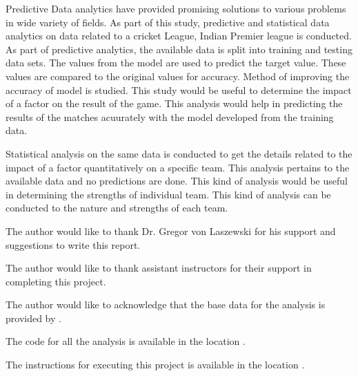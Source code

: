 \documentclass[sigconf]{acmart}
\begin{document}
Predictive Data analytics have provided promising solutions to various problems in wide variety of fields. As part of this study, predictive and statistical data analytics on data related to a cricket League, Indian Premier league is conducted.  As part of predictive analytics, the available data is split into training and testing data sets. The values from the model are used to predict the target value. These values are compared to the original values for accuracy. Method of improving the accuracy of model is studied. This study would be useful to determine the impact of a factor on the result of the game. This analysis would help in predicting the results of the matches acuurately with the model developed from the training data.

Statistical analysis on the same data is conducted to get the details related to the impact of a factor quantitatively on a specific team. This analysis pertains to the available data and no predictions are done. This kind of analysis would be useful in determining the strengths of individual team. This kind of analysis can be conducted to the nature and strengths of each team.

\begin{acks}

  The author would like to thank Dr. Gregor von Laszewski for his
  support and suggestions to write this report.
  
  The author would like to thank assistant instructors for their support in completing this project.
  
  The author would like to acknowledge that the base data for the analysis is provided  by \cite{data} .
  

\end{acks}


 

\appendix



The code for all the analysis is available in the location \cite{code} .

The instructions for executing this project is available in the location \cite{requirements} .
\end{document}

